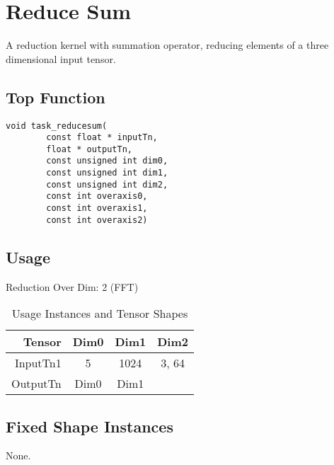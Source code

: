 \pagebreak









\section{Reduce Sum}
A reduction kernel with summation operator, reducing elements of a three dimensional input tensor.
\subsection{Top Function}
\begin{lstlisting}
void task_reducesum(
        const float * inputTn,
        float * outputTn,
        const unsigned int dim0,
        const unsigned int dim1,
        const unsigned int dim2,
        const int overaxis0,
        const int overaxis1,
        const int overaxis2)
\end{lstlisting}

\subsection{Usage}
Reduction Over Dim: 2 (FFT)
\vspace{0.5cm}
\begin{table}[htbp] %
\caption{Usage Instances and Tensor Shapes}
\label{tab:shapes_concat}
	\begin{center}
		\begin{tabular}{|r|c|c|c|} 
		\hline	
		Tensor & Dim0 & Dim1 & Dim2\\ 
		\hline	
		InputTn1 &
			5 &
			1024 &
			3, 64 \\ 
		\hline
		OutputTn &
			Dim0 & 
			Dim1 & 
				\\
		\hline
		\end{tabular}
	\end{center}
\end{table}

\subsection{Fixed Shape Instances}
None.

